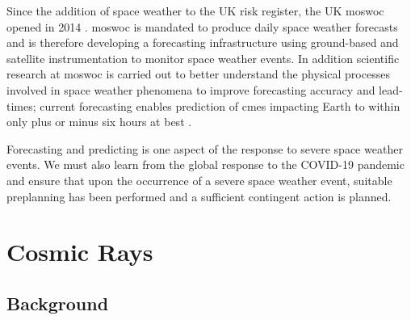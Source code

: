 Since the addition of space weather to the UK risk register, the UK \gls{moswoc} opened in 2014 \citep{bis_space_2015}. \gls{moswoc} is mandated to produce daily space weather forecasts and is therefore developing a forecasting infrastructure using ground-based and satellite instrumentation to monitor space weather events. In addition scientific research at \gls{moswoc} is carried out to better understand the physical processes involved in space weather phenomena to improve forecasting accuracy and lead-times; current forecasting enables prediction of \glspl{cme} impacting Earth to within only plus or minus six hours at best \citep{metoffice_space_2013}.

Forecasting and predicting is one aspect of the response to severe space weather events. We must also learn from the global response to the COVID-19 pandemic and ensure that upon the occurrence of a severe space weather event, suitable preplanning has been performed and a sufficient contingent action is planned.





\section{Cosmic Rays}\label{sec:intro_CRs}


\subsection{Background}

